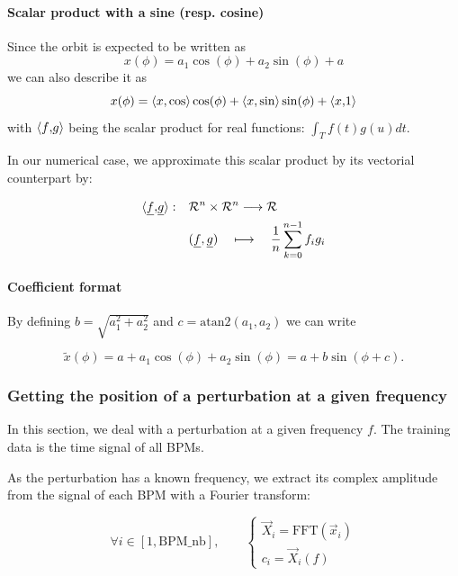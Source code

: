\paragraph{Scalar product with a sine (resp. cosine)}
Since the orbit is expected to be written as
\begin{equation*}
x(\phi) = a_1 \cos(\phi) + a_2 \sin(\phi) + a
\end{equation*}
we can also describe it as
\begin{equation}
x(\phi) = \langle x {,} \cos \rangle \cos(\phi) + \langle x {,} \sin \rangle \sin(\phi) + \langle x {,} 1 \rangle
\end{equation}
with $\langle f {,} g \rangle$ being the scalar product for real functions: $\int_T f(t)g(u)dt$.

In our numerical case, we approximate this scalar product by its vectorial counterpart by:

\begin{align*}
\langle \underline{f} {,} \underline{g} \rangle: \quad
 &\mathcal{R}^n \times \mathcal{R}^n \longrightarrow \mathcal{R} \\
 & (\underline{f},\underline{g}) \quad\longmapsto \quad \frac{1}{n}\sum\limits_{k=0}^{n-1} f_i g_i
\end{align*}

\paragraph{Coefficient format}
By defining $b = \sqrt{a_1^2+a_2^2}$ and $c = \mathrm{atan2}(a_1, a_2)$  we can write

\begin{equation*}
\tilde{x}(\phi) = a + a_1 \cos(\phi) + a_2 \sin(\phi) = a + b \sin(\phi + c).
\end{equation*} 


\subsubsection{Getting the position of a perturbation at a given frequency}
In this section, we deal with a perturbation at a given frequency $f$. The training data is the time signal of all BPMs.

As the perturbation has a known frequency, we extract its complex amplitude from the signal of each BPM with a Fourier transform:

\begin{equation}
\forall i \in [1, \mathrm{BPM\_nb}], \qquad 
\begin{cases}
\vec{X}_i = \mathrm{FFT}(\vec{x}_i) \\
c_i = \vec{X}_i(f)
\end{cases}
\end{equation}

